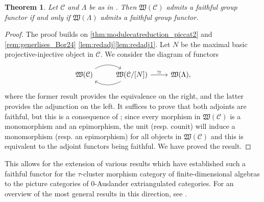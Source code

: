 \documentclass[10pt,twoside, a4paper,reqno]{amsart}
\newcommand{\Wfrak}{\mathfrak{W}}
\newcommand{\calC}{\mathcal{C}}
\newtheorem{theorem}{Theorem}[section]
\theoremstyle{definition}
\begin{document}
\begin{theorem}\label{thm:faithfulgroupfunctor}
    Let $\calC$ and $\Lambda$ be as in . Then $\Wfrak(\calC)$ admits a faithful group functor if and only if $\Wfrak(\Lambda)$ admits a faithful group functor. 
\end{theorem}

\begin{proof}
    The proof builds on \eqref{thm:modulecatreduction_piccat2} and \eqref{rem:generlises_Bor24} \cref{lem:redadj}\eqref{lem:redadj1}. {Let $N$ be the maximal basic projective-injective object in $\calC$.} We consider the diagram of functors
    \begin{equation}\label{eq:faithfulgroupfunctor_toLambda}
    \begin{tikzcd}
        \Wfrak(\calC) \arrow[r,bend left] & \arrow[l,bend left] \Wfrak(\calC/[N])\arrow[r,"\simeq"] & \Wfrak(\Lambda),
    \end{tikzcd}
    \end{equation}
    where the former result provides the equivalence on the right, and the latter provides the adjunction on the left. It suffices to prove that both adjoints are faithful, but this is a consequence of ; since every morphism in $\Wfrak(\calC)$ is a monomorphism {and an epimorphism}, the unit (resp. counit) will induce a monomorphism (resp. an epimorphism) for all objects in $\Wfrak(\calC)$ and this is equivalent to the adjoint functors being faithful. We have proved the result.
\end{proof}

This allows for the extension of various results which have established such a faithful functor for the $\tau$-cluster morphism category of finite-dimensional algebras to the picture categories of 0-Auslander extriangulated categories. For an overview of the most general results in this direction, see \cite{BorveKaipeltautilt,Kai23,Treffinger26}.



\end{document}
